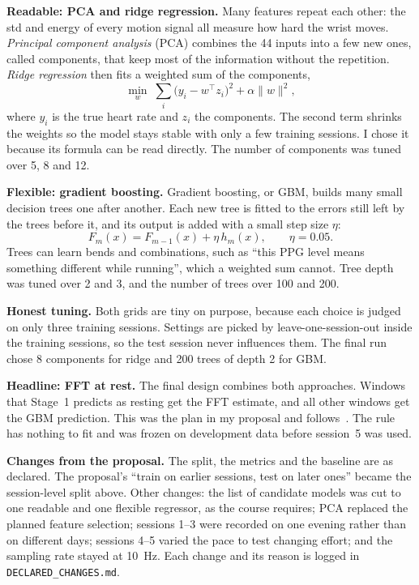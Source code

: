\documentclass[conference]{IEEEtran}
\begin{document}
\textbf{Readable: PCA and ridge regression.} Many features repeat each other: the std and energy of every motion signal all measure how hard the wrist moves. \emph{Principal component analysis} (PCA) combines the 44 inputs into a few new ones, called components, that keep most of the information without the repetition. \emph{Ridge regression} then fits a weighted sum of the components,
\begin{equation}
\min_{w}\; \sum_i \big(y_i - w^\top z_i\big)^2 + \alpha \lVert w \rVert^2 ,
\end{equation}
where $y_i$ is the true heart rate and $z_i$ the components. The second term shrinks the weights so the model stays stable with only a few training sessions. I chose it because its formula can be read directly. The number of components was tuned over 5, 8 and 12.

\textbf{Flexible: gradient boosting.} Gradient boosting, or GBM, builds many small decision trees one after another. Each new tree is fitted to the errors still left by the trees before it, and its output is added with a small step size $\eta$:
\begin{equation}
F_m(x) = F_{m-1}(x) + \eta\, h_m(x), \qquad \eta = 0.05 .
\end{equation}
Trees can learn bends and combinations, such as ``this PPG level means something different while running'', which a weighted sum cannot. Tree depth was tuned over 2 and 3, and the number of trees over 100 and 200.

\textbf{Honest tuning.} Both grids are tiny on purpose, because each choice is judged on only three training sessions. Settings are picked by leave-one-session-out inside the training sessions, so the test session never influences them. The final run chose 8 components for ridge and 200 trees of depth 2 for GBM.

\textbf{Headline: FFT at rest.} The final design combines both approaches. Windows that Stage~1 predicts as resting get the FFT estimate, and all other windows get the GBM prediction. This was the plan in my proposal and follows~\cite{vicente2023}. The rule has nothing to fit and was frozen on development data before session~5 was used.

\textbf{Changes from the proposal.} The split, the metrics and the baseline are as declared. The proposal's ``train on earlier sessions, test on later ones'' became the session-level split above. Other changes: the list of candidate models was cut to one readable and one flexible regressor, as the course requires; PCA replaced the planned feature selection; sessions 1--3 were recorded on one evening rather than on different days; sessions 4--5 varied the pace to test changing effort; and the sampling rate stayed at 10~Hz. Each change and its reason is logged in \texttt{DECLARED\_CHANGES.md}.
\end{document}
